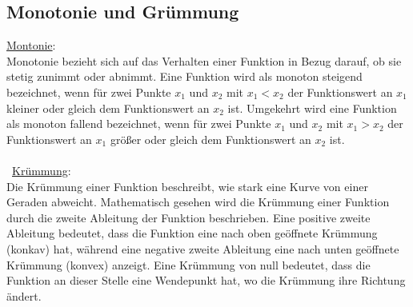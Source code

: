 \subsection{Monotonie und Grümmung}
\underline{Montonie}: \\
Monotonie bezieht sich auf das Verhalten einer Funktion in Bezug darauf, 
ob sie stetig zunimmt oder abnimmt. 
Eine Funktion wird als monoton steigend bezeichnet, 
wenn für zwei Punkte $x_1$ und $x_2$ mit $x_1 < x_2$ der Funktionswert an $x_1$ kleiner oder gleich dem Funktionswert an $x_2$ ist. 
Umgekehrt wird eine Funktion als monoton fallend bezeichnet, 
wenn für zwei Punkte $x_1$ und $x_2$ mit $x_1>x_2$ der Funktionswert an $x_1$ größer oder gleich dem Funktionswert an $x_2$ ist. \\\\
\
\underline{Krümmung}: \\
Die Krümmung einer Funktion beschreibt, wie stark eine Kurve von einer Geraden abweicht. 
Mathematisch gesehen wird die Krümmung einer Funktion durch die zweite Ableitung der Funktion beschrieben. 
Eine positive zweite Ableitung bedeutet, 
dass die Funktion eine nach oben geöffnete Krümmung (konkav) hat, 
während eine negative zweite Ableitung eine nach unten geöffnete Krümmung (konvex) anzeigt. 
Eine Krümmung von null bedeutet, dass die Funktion an dieser Stelle eine Wendepunkt hat, 
wo die Krümmung ihre Richtung ändert.
